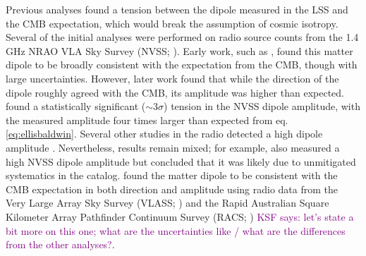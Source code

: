 \documentclass[modern]{aastex631}
\newcommand{\ksf}[1]{\textcolor{purple}{KSF says: #1}}
\begin{document}
Previous analyses found a tension between the dipole measured in the LSS and the CMB expectation, which would break the assumption of cosmic isotropy.
Several of the initial analyses were performed on radio source counts from the 1.4 GHz NRAO VLA Sky Survey (NVSS; \citealt{condon_nrao_1998}).
Early work, such as \citet{blake_detection_2002}, found this matter dipole to be broadly consistent with the expectation from the CMB, though with large uncertainties.
However, later work found that while the direction of the dipole roughly agreed with the CMB, its amplitude was higher than expected.
\citet{singal_large_2011} found a statistically significant ($\sim3\sigma$) tension in the NVSS dipole amplitude, with the measured amplitude four times larger than expected from eq. \ref{eq:ellisbaldwin}.
Several other studies in the radio detected a high dipole amplitude \citep{rubart_cosmic_2013, tiwari_dipole_2015, colin_high_2017, bengaly_probing_2018}.
Nevertheless, results remain mixed; for example, \citet{gibelyou_dipoles_2012} also measured a high NVSS dipole amplitude but concluded that it was likely due to unmitigated systematics in the catalog.
\citet{darling_universe_2022} found the matter dipole to be consistent with the CMB expectation in both direction and amplitude using radio data from the Very Large Array Sky Survey (VLASS; \citealt{lacy_karl_2020}) and the Rapid
Australian Square Kilometer Array Pathfinder Continuum
Survey (RACS; \citealt{mcconnell_rapid_2020}) \ksf{let's state a bit more on this one; what are the uncertainties like / what are the differences from the other analyses?}.
\end{document}
